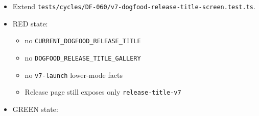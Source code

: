 \begin{itemize}
\tightlist
\item
  Extend \texttt{t\allowbreak{}e\allowbreak{}s\allowbreak{}t\allowbreak{}s\allowbreak{}/\allowbreak{}c\allowbreak{}y\allowbreak{}c\allowbreak{}l\allowbreak{}e\allowbreak{}s\allowbreak{}/\allowbreak{}D\allowbreak{}F\allowbreak{}-\allowbreak{}0\allowbreak{}6\allowbreak{}0\allowbreak{}/\allowbreak{}v\allowbreak{}7\allowbreak{}-\allowbreak{}d\allowbreak{}o\allowbreak{}g\allowbreak{}f\allowbreak{}o\allowbreak{}o\allowbreak{}d\allowbreak{}-\allowbreak{}r\allowbreak{}e\allowbreak{}l\allowbreak{}e\allowbreak{}a\allowbreak{}s\allowbreak{}e\allowbreak{}-\allowbreak{}t\allowbreak{}i\allowbreak{}t\allowbreak{}l\allowbreak{}e\allowbreak{}-\allowbreak{}s\allowbreak{}c\allowbreak{}r\allowbreak{}e\allowbreak{}e\allowbreak{}n\allowbreak{}.\allowbreak{}t\allowbreak{}e\allowbreak{}s\allowbreak{}t\allowbreak{}.\allowbreak{}t\allowbreak{}s}.
\item
  RED state:

  \begin{itemize}
  \tightlist
  \item
    no \texttt{C\allowbreak{}U\allowbreak{}R\allowbreak{}R\allowbreak{}E\allowbreak{}N\allowbreak{}T\allowbreak{}\_\allowbreak{}D\allowbreak{}O\allowbreak{}G\allowbreak{}F\allowbreak{}O\allowbreak{}O\allowbreak{}D\allowbreak{}\_\allowbreak{}R\allowbreak{}E\allowbreak{}L\allowbreak{}E\allowbreak{}A\allowbreak{}S\allowbreak{}E\allowbreak{}\_\allowbreak{}T\allowbreak{}I\allowbreak{}T\allowbreak{}L\allowbreak{}E}
  \item
    no \texttt{D\allowbreak{}O\allowbreak{}G\allowbreak{}F\allowbreak{}O\allowbreak{}O\allowbreak{}D\allowbreak{}\_\allowbreak{}R\allowbreak{}E\allowbreak{}L\allowbreak{}E\allowbreak{}A\allowbreak{}S\allowbreak{}E\allowbreak{}\_\allowbreak{}T\allowbreak{}I\allowbreak{}T\allowbreak{}L\allowbreak{}E\allowbreak{}\_\allowbreak{}G\allowbreak{}A\allowbreak{}L\allowbreak{}L\allowbreak{}E\allowbreak{}R\allowbreak{}Y}
  \item
    no \texttt{v\allowbreak{}7\allowbreak{}-\allowbreak{}l\allowbreak{}a\allowbreak{}u\allowbreak{}n\allowbreak{}c\allowbreak{}h} lower-mode facts
  \item
    Release page still exposes only \texttt{r\allowbreak{}e\allowbreak{}l\allowbreak{}e\allowbreak{}a\allowbreak{}s\allowbreak{}e\allowbreak{}-\allowbreak{}t\allowbreak{}i\allowbreak{}t\allowbreak{}l\allowbreak{}e\allowbreak{}-\allowbreak{}v\allowbreak{}7}
  \end{itemize}
\item
  GREEN state:


\end{itemize}
